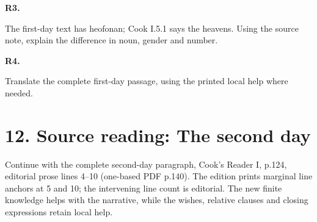 \par\begin{minipage}{\linewidth}\raggedright
\textbf{R3.}

The first-day text has heofonan; Cook I.5.1 says the heavens. Using the source note, explain the difference in noun, gender and number.

\end{minipage}\par\addvspace{4pt}

\par\begin{minipage}{\linewidth}\raggedright
\textbf{R4.}

Translate the complete first-day passage, using the printed local help where needed.

\end{minipage}\par\addvspace{4pt}

\section*{12. Source reading: The second day}

Continue with the complete second-day paragraph, Cook’s Reader I, p.124, editorial prose lines 4–10 (one-based PDF p.140). The edition prints marginal line anchors at 5 and 10; the intervening line count is editorial. The new finite knowledge helps with the narrative, while the wishes, relative clauses and closing expressions retain local help.

\par\begin{minipage}{\linewidth}\raggedright
{}
\end{minipage}\par

